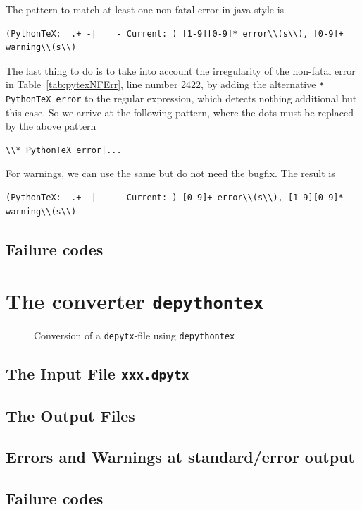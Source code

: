 \documentclass[a4paper, english]{article}%
\newcommand{\dpytex}{\texttt{depythontex}}
\begin{document}
The pattern to match at least one non-fatal error in java style is 
%
\begin{Verbatim}[showspaces=true, fontsize=\small]
(PythonTeX:  .+ -|    - Current: ) [1-9][0-9]* error\\(s\\), [0-9]+ warning\\(s\\)
\end{Verbatim}
%
The last thing to do is to take into account the irregularity 
of the non-fatal error in Table~\ref{tab:pytexNFErr}, line number 2422, 
by adding the alternative \texttt{* PythonTeX error} to the regular expression, 
which detects nothing additional but this case. 
So we arrive at the following pattern, where the dots must be replaced by the above pattern 
%
\begin{Verbatim}[showspaces=true, fontsize=\small]
\\* PythonTeX error|...
\end{Verbatim}

For warnings, we can use the same but do not need the bugfix. 
The result is 
%
\begin{Verbatim}[showspaces=true, fontsize=\small]
(PythonTeX:  .+ -|    - Current: ) [0-9]+ error\\(s\\), [1-9][0-9]* warning\\(s\\)
\end{Verbatim}
  


\subsection{Failure codes}\label{subsec:pytexFCodes}

\section{The converter \dpytex}\label{sec:dpytex}

\begin{figure}[htb]
  \centering
  \caption{\label{fig:depy2out}Conversion of a \texttt{depytx}-file using \texttt{depythontex}}
  \end{figure}


\subsection{The Input File \texttt{xxx.dpytx}}\label{subsec:dpytexInFile}

\subsection{The Output Files}\label{subsec:dpytexOutFile}

\subsection{Errors and Warnings at standard/error output}\label{subsec:dpytexErrWarn}

\subsection{Failure codes}\label{subsec:dpytexFCodes}



\end{document}
